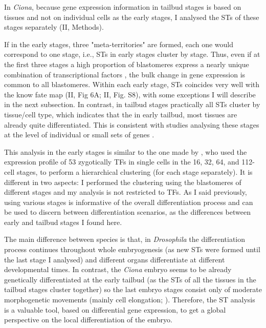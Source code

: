 In \textit{Ciona}, because gene expression information in tailbud stages is based on tissues and not on individual cells as the early stages, I analysed the STs of these stages separately (II, Methods). 

If in the early stages, three "meta-territories" are formed, each one would correspond to one stage, i.e., STs in early stages cluster by stage.
Thus, even if at the first three stages a high proportion of blastomeres express a nearly unique combination of transcriptional factors \citep{Imai2006}, the bulk change in gene expression is common to all blastomeres. Within each early stage, STs coincides very well with the know fate map (II, Fig 6A; II, Fig. S8), with some exceptions I will describe in the next subsection.
%
In contrast, in tailbud stages practically all STs cluster by tissue/cell type, which indicates that the in early tailbud, most tissues are already quite differentiated.
This is consistent with studies analysing these stages at the level of individual or small sets of genes \citep{Corbo1997,DiGregorio1999}.

This analysis in the early stages is similar to the one made by \citet{Imai2006}, who used the expression profile of 53 zygotically TFs in single cells in the 16, 32, 64, and 112-cell stages, to perform a hierarchical clustering (for each stage separately). 
It is different in two aspects: I performed the clustering using the blastomeres of different stages and my analysis is not restricted to TFs. As I said previously, using various stages is informative of the overall differentiation process and can be used to discern between differentiation scenarios, as the differences between early and tailbud stages I found here.


The main difference between species is that, in \textit{Drosophila} the differentiation process continues throughout whole embryogenesis (as new STs were formed until the last stage I analysed) and different organs differentiate at different developmental times.
In contrast, the \textit{Ciona} embryo seems to be already genetically differentiated at the early tailbud (as the STs of all the tissues in the tailbud stages cluster together) so the last embryo stages consist only of moderate morphogenetic movements (mainly cell elongation; \citealp{Hotta2007}).
Therefore, the ST analysis is a valuable tool, based on differential gene expression, to get a global perspective on the local differentiation of the embryo.